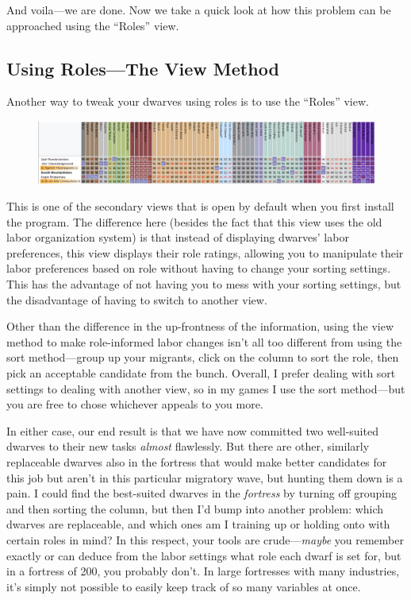 \documentclass[]{article}
\begin{document}
And voila---we are done. Now we take a quick look at how this problem can be approached using the
``Roles'' view.

\newpage
\subsection{Using Roles---The View Method}
\label{sec:Using Roles---The View Method}

Another way to tweak your dwarves using roles is to use the ``Roles'' view.%

\begin{figure}[h!]
\centering
\includegraphics[width=\linewidth]{Sec3Fig10+}
\end{figure}

This is one of the secondary views that is open by default when you first install the program. The
difference here (besides the fact that this view uses the old labor organization system) is that instead
of displaying dwarves' labor preferences, this view displays their role ratings, allowing you to
manipulate their labor preferences based on role without having to change your sorting settings. This has
the advantage of not having you to mess with your sorting settings, but the disadvantage of having to
switch to another view.

Other than the difference in the up-frontness of the information, using the view method to make
role-informed labor changes isn't all too different from using the sort method---group up your
migrants, click on the column to sort the role, then pick an acceptable candidate from the bunch.
Overall, I prefer dealing with sort settings to dealing with another view, so in my games I use the sort
method---but you are free to chose whichever appeals to you more.

In either case, our end result is that we have now committed two well-suited dwarves to their new
tasks \emph{almost} flawlessly. But there are other, similarly replaceable dwarves also in the fortress
that would make better candidates for this job but aren't in this particular migratory wave, but hunting
them down is a pain. I could find the best-suited dwarves in the \emph{fortress} by turning off grouping
and then sorting the column, but then I'd bump into another problem: which dwarves are replaceable, and
which ones am I training up or holding onto with certain roles in mind? In this respect, your tools are
crude---\emph{maybe} you remember exactly or can deduce from the labor settings what role each dwarf is
set for, but in a fortress of 200, you probably don't. In large fortresses with many industries, it's
simply not possible to easily keep track of so many variables at once.
\end{document}
